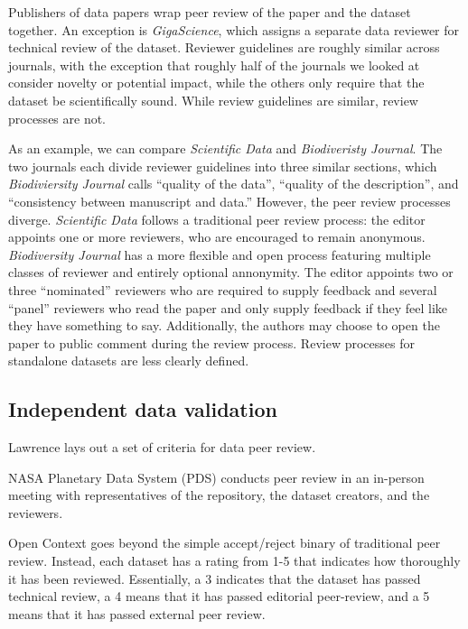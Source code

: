 \documentclass[10pt,twocolumn]{article}
\begin{document}
Publishers of data papers wrap peer review of the paper and the dataset together.
An exception is \emph{GigaScience}, which assigns a separate data reviewer for technical review of the dataset.
Reviewer guidelines are roughly similar across journals, with the exception that roughly half of the journals we looked at consider novelty or potential impact, while the others only require that the dataset be scientifically sound.
While review guidelines are similar, review processes are not.

As an example, we can compare \emph{Scientific Data} and \emph{Biodiveristy Journal}.
The two journals each divide reviewer guidelines into three similar sections, which \emph{Biodiviersity Journal} calls ``quality of the data'', ``quality of the description'', and ``consistency between manuscript and data.''
However, the peer review processes diverge.
\emph{Scientific Data} follows a traditional peer review process: the editor appoints one or more reviewers, who are encouraged to remain anonymous.
\emph{Biodiversity Journal} has a more flexible and open process featuring multiple classes of reviewer and entirely optional annonymity.
The editor appoints two or three ``nominated'' reviewers who are required to supply feedback and several ``panel'' reviewers who read the paper and only supply feedback if they feel like they have something to say.
Additionally, the authors may choose to open the paper to public comment during the review process.
Review processes for standalone datasets are less clearly defined.

\subsection*{Independent data validation}\label{post-publication-review}



	Lawrence lays out a set of criteria for data peer review.\cite{lawrence_citation_2011}

NASA Planetary Data System (PDS) conducts peer review in an in-person meeting with representatives of the repository, the dataset creators, and the reviewers.

Open Context goes beyond the simple accept/reject binary of traditional peer review.\cite{kansa_we_2013}
Instead, each dataset has a rating from 1-5 that indicates how thoroughly it has been reviewed.
Essentially, a 3 indicates that the dataset has passed technical review, a 4 means that it has passed editorial peer-review, and a 5 means that it has passed external peer review.
\end{document}
